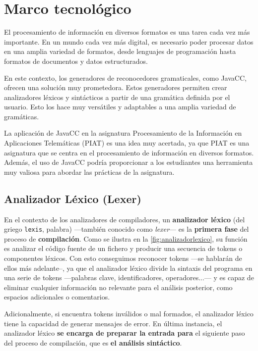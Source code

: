 \section{Marco tecnológico}

\noindent El procesamiento de información en diversos formatos es una tarea cada vez más importante. En un mundo cada vez más digital, es necesario poder procesar datos en una amplia variedad de formatos, desde lenguajes de programación hasta formatos de documentos y datos estructurados.

En este contexto, los generadores de reconocedores gramaticales, como JavaCC, ofrecen una solución muy prometedora. Estos generadores permiten crear analizadores léxicos y sintácticos a partir de una gramática definida por el usuario. Esto los hace muy versátiles y adaptables a una amplia variedad de gramáticas.

La aplicación de JavaCC en la asignatura Procesamiento de la Información en Aplicaciones Telemáticas (PIAT) es una idea muy acertada, ya que PIAT es una asignatura que se centra en el procesamiento de información en diversos formatos. Además, el uso de JavaCC podría proporcionar a los estudiantes una herramienta muy valiosa para abordar las prácticas de la asignatura.

\subsection{Analizador Léxico (Lexer)}

\noindent En el contexto de los analizadores de compiladores, un \textbf{analizador léxico} (del griego \lstinline|lexis|, palabra) ---también conocido como \textit{lexer}--- es la \textbf{primera fase} del proceso de \textbf{compilación}. Como se ilustra en la \autoref{fig:analizadorlexico}, su función es analizar el código fuente de un fichero y producir una secuencia de tokens o componentes léxicos\cite{lexer}. Con esto conseguimos reconocer tokens ---se hablarán de ellos más adelante--, ya que el analizador léxico divide la sintaxis del programa en una serie de tokens ---palabras clave, identificadores, operadores...--- y es capaz de eliminar cualquier información no relevante para el análisis posterior, como espacios adicionales o comentarios. 

Adicionalmente, si encuentra tokens inválidos o mal formados, el analizador léxico tiene la capacidad de generar mensajes de error. En última instancia, el analizador léxico \textbf{se encarga de preparar la entrada para} el siguiente paso del proceso de compilación, que es \textbf{el análisis sintáctico}.

